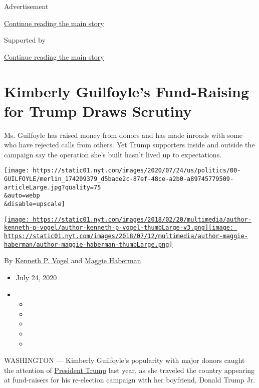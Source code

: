 Advertisement

\protect\hyperlink{after-top}{Continue reading the main story}

Supported by

\protect\hyperlink{after-sponsor}{Continue reading the main story}

\hypertarget{kimberly-guilfoyles-fund-raising-for-trump-draws-scrutiny}{%
\section{Kimberly Guilfoyle's Fund-Raising for Trump Draws
Scrutiny}\label{kimberly-guilfoyles-fund-raising-for-trump-draws-scrutiny}}

Ms. Guilfoyle has raised money from donors and has made inroads with
some who have rejected calls from others. Yet Trump supporters inside
and outside the campaign say the operation she's built hasn't lived up
to expectations.

\texttt{[image: https://static01.nyt.com/images/2020/07/24/us/politics/00-GUILFOYLE/merlin\_174209379\_d5bade2c-87ef-48ce-a2b0-a89745779509-articleLarge.jpg?quality=75\\\&auto=webp\\\&disable=upscale]}

\href{https://www.nytimes.com/by/kenneth-p-vogel}{\texttt{[image: https://static01.nyt.com/images/2018/02/20/multimedia/author-kenneth-p-vogel/author-kenneth-p-vogel-thumbLarge-v3.png]}}\href{https://www.nytimes.com/by/maggie-haberman}{\texttt{[image: https://static01.nyt.com/images/2018/07/12/multimedia/author-maggie-haberman/author-maggie-haberman-thumbLarge.png]}}

By \href{https://www.nytimes.com/by/kenneth-p-vogel}{Kenneth P. Vogel}
and \href{https://www.nytimes.com/by/maggie-haberman}{Maggie Haberman}

\begin{itemize}
\item
  July 24, 2020
\item
  \begin{itemize}
  \item
  \item
  \item
  \item
  \item
  \end{itemize}
\end{itemize}

WASHINGTON --- Kimberly Guilfoyle's popularity with major donors caught
the attention of
\href{https://www.nytimes.com/interactive/2020/us/elections/donald-trump.html}{President
Trump} last year, as she traveled the country appearing at fund-raisers
for his re-election campaign with her boyfriend, Donald Trump Jr.

